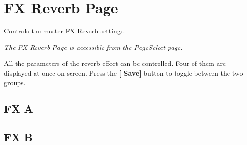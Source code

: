 \chapter{FX Reverb Page}
Controls the master FX Reverb settings.

\textit{The FX Reverb Page is accessible from the PageSelect page.}

All the parameters of the reverb effect can be controlled. Four of them are displayed at once on screen. Press the \textbf{[ Save] } button to toggle between the two groups.

\section{FX A}

\newpage
\section{FX B}

